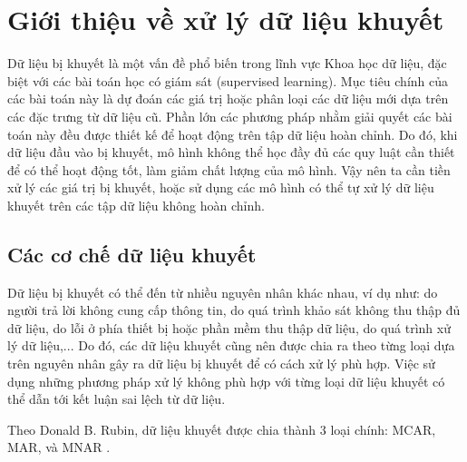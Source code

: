\section{Giới thiệu về xử lý dữ liệu khuyết}
Dữ liệu bị khuyết là một vấn đề phổ biến trong lĩnh vực Khoa học dữ liệu, đặc biệt với các bài toán học có giám sát (supervised learning). Mục tiêu chính của các bài toán này là dự đoán các giá trị hoặc phân loại các dữ liệu mới dựa trên các đặc trưng từ dữ liệu cũ. Phần lớn các phương pháp nhằm giải quyết các bài toán này đều được thiết kế để hoạt động trên tập dữ liệu hoàn chỉnh. Do đó, khi dữ liệu đầu vào bị khuyết, mô hình không thể học đầy đủ các quy luật cần thiết để có thể hoạt động tốt, làm giảm chất lượng của mô hình. Vậy nên ta cần tiền xử lý các giá trị bị khuyết, hoặc sử dụng các mô hình có thể tự xử lý dữ liệu khuyết 
trên các tập dữ liệu không hoàn chỉnh.



\subsection{Các cơ chế dữ liệu khuyết} \label{section:missingmechanism}
Dữ liệu bị khuyết có thể đến từ nhiều nguyên nhân khác nhau, ví dụ như: do người trả lời không cung cấp thông tin, do quá trình khảo sát không thu thập đủ dữ liệu, do lỗi ở phía thiết bị hoặc phần mềm thu thập dữ liệu, do quá trình xử lý dữ liệu,... Do đó, các dữ liệu khuyết cũng nên được chia ra theo từng loại dựa trên nguyên nhân gây ra dữ liệu bị khuyết để có cách xử lý phù hợp. Việc sử dụng những phương pháp xử lý không phù hợp với từng loại dữ liệu khuyết có thể dẫn tới kết luận sai lệch từ dữ liệu.

Theo Donald B. Rubin, dữ liệu khuyết được chia thành 3 loại chính: MCAR, MAR, và MNAR \cite{rubin1976inference}.

